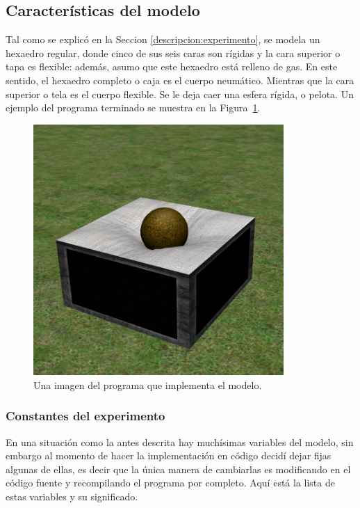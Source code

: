 \subsection{Características del modelo}
Tal como se explicó en la Seccion \ref{descripcion:experimento}, se modela un hexaedro regular, donde cinco de sus seis caras son rígidas y la cara superior o tapa es flexible: además, asumo que este hexaedro está relleno de gas.
En este sentido, el hexaedro completo o caja es el cuerpo neumático.
Mientras que la cara superior o tela es el cuerpo flexible.
Se le deja caer una esfera rígida, o pelota.
Un ejemplo del programa terminado se muestra en la Figura~\ref{programa:portada}.
\begin{figure}
 \centering
 \includegraphics[width=0.85\textwidth]{Img/04/modeloPortada}
 \caption[Ejemplo del programa en ejecución]{Una imagen del programa que implementa el modelo.}
 \label{programa:portada}
\end{figure}

\subsubsection{Constantes del experimento}
En una situación como la antes descrita hay muchísimas variables del modelo, sin embargo al momento de hacer la implementación en código decidí dejar fijas algunas de ellas, es decir que la única manera de cambiarlas es modificando en el código fuente y recompilando el programa por completo.
Aquí está la lista de estas variables y su significado.

